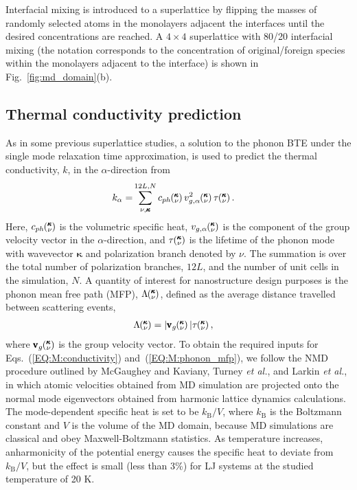 \documentclass[aps,prb,preprint,preprintnumbers,amsmath,amssymb,floatfix,superscriptaddress]{revtex4}
\newcommand{\kv}{\mspace{-4.0mu}\left(\mspace{-8.0mu}
\begin{smallmatrix}&\pmb{\kappa} \\&\nu\end{smallmatrix}
\mspace{-3.0mu}\right)}
\begin{document}
Interfacial mixing is introduced to a superlattice by flipping the masses of randomly selected atoms in the monolayers adjacent the interfaces until the desired concentrations are reached.\cite{PhysRevB.79.075316} A $4\times4$ superlattice with 80/20 interfacial mixing (the notation corresponds to the concentration of original/foreign species within the monolayers adjacent to the interface) is shown in Fig.~\ref{fig:md_domain}(b).

\subsection{Thermal conductivity prediction}\label{SEC:methods}

As in some previous superlattice studies, \cite{Luckyanova16112012,doi:10.1021/nl202186y,savic:073113,PhysRevB.87.140302} a solution to the phonon BTE under the single mode relaxation time approximation,\cite{ziman_electrons_2001} is used to predict the thermal conductivity, $k$, in the $\alpha$-direction from
\begin{equation}\label{EQ:M:conductivity}
\begin{split}
k_{\mathbf{\alpha}}=&\sum_{\nu,\pmb{\kappa}}^{12L,N} c_{ph}\kv
v^{2}_{g,\mathbf{\alpha}}\kv \tau\kv.
\end{split}
\end{equation}
Here, $c_{ph}\kv$ is the volumetric specific heat, $v_{g,\mathbf{\alpha}}\kv$ is the component of the group velocity vector in the $\alpha$-direction, and $\tau\kv$ is the lifetime of the phonon mode with wavevector $\pmb{\kappa}$ and polarization branch denoted by $\nu$. The summation is over the total number of polarization branches, $12L$, and the number of unit cells in the simulation, $N$. A quantity of interest for nanostructure design purposes \cite{PhysRevB.87.035437} is the phonon mean free path (MFP), $\Lambda\kv$, defined as the average distance travelled between scattering events, \cite{ziman_electrons_2001}
\begin{equation}\label{EQ:M:phonon_mfp}
\begin{split}
\Lambda\kv &= |\pmb{\mathrm{v}}_{g}\kv | \tau\kv,
\end{split}
\end{equation}
where $\pmb{\mathrm{v}}_{g}\kv$ is the group velocity vector. To obtain the required inputs for Eqs.~(\ref{EQ:M:conductivity}) and~(\ref{EQ:M:phonon_mfp}), we follow the NMD procedure outlined by McGaughey and Kaviany,\cite{PhysRevB.71.184305} Turney \textit{et al.},\cite {PhysRevB.79.064301} and Larkin \textit{et al.},\cite{jason_inpress} in which atomic velocities obtained from MD simulation are projected onto the normal mode eigenvectors obtained from harmonic lattice dynamics calculations. The mode-dependent specific heat is set to be $k_\mathrm{B}/V$, where  $k_\mathrm{B}$ is the Boltzmann constant and $V$ is the volume of the MD domain, because MD simulations are classical and obey Maxwell-Boltzmann statistics. As temperature increases, anharmonicity of the potential energy causes the specific heat to deviate from $k_\mathrm{B}/V$, but the effect is small (less than 3\%) for LJ systems at the studied temperature of 20 K.\cite{PhysRevB.71.184305} 
\end{document}
